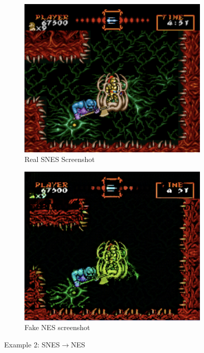 \documentclass[10pt,twocolumn,letterpaper]{article}
\begin{document}
\begin{figure}[htp]
   \centering
   \begin{subfigure}[b]{0.235\textwidth}
      \includegraphics[width=\textwidth]{figures/snes_to_nes/ghouls_n_ghosts_real_B.png}
      \caption{Real SNES Screenshot}
      \label{fig:ss2a}
   \end{subfigure}
   \begin{subfigure}[b]{0.235\textwidth}
      \includegraphics[width=\textwidth]{figures/snes_to_nes/ghouls_n_ghosts_fake_A.png}
      \caption{Fake NES screenshot}
      \label{fig:ss2b}
   \end{subfigure}
   \caption{Example 2: SNES$\rightarrow$NES}
\end{figure}
\end{document}
